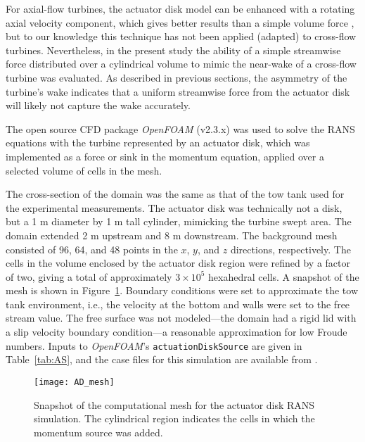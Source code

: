 For axial-flow turbines, the actuator disk model can be enhanced with a rotating
axial velocity component, which gives better results than a simple volume force
\cite{Wu2011}, but to our knowledge this technique has not been applied
(adapted) to cross-flow turbines. Nevertheless, in the present study the
ability of a simple streamwise force distributed over a cylindrical volume to
mimic the near-wake of a cross-flow turbine was evaluated. As described in
previous sections, the asymmetry of the turbine's wake indicates that a uniform
streamwise force from the actuator disk will likely not capture the wake
accurately.

The open source CFD package \textit{OpenFOAM} (v2.3.x) was used to solve the
RANS equations with the turbine represented by an actuator disk, which was
implemented as a force or sink in the momentum equation, applied over a selected
volume of cells in the mesh.

The cross-section of the domain was the same as that of the tow tank used for
the experimental measurements. The actuator disk was technically not a disk, but
a 1 m diameter by 1 m tall cylinder, mimicking the turbine swept area. The
domain extended 2 m upstream and 8 m downstream.  The background mesh consisted
of 96, 64, and 48 points in the $x$, $y$, and $z$ directions, respectively. The
cells in the volume enclosed by the actuator disk region were refined by a
factor of two, giving a total of  approximately $3 \times 10^5$ hexahedral
cells. A snapshot of the mesh is shown in Figure~\ref{fig:AD-mesh}. Boundary
conditions were set to approximate the tow tank environment, i.e., the velocity
at the bottom and walls were set to the free stream value. The free surface was
not modeled---the domain had a rigid lid with a slip velocity boundary
condition---a reasonable approximation for low Froude numbers. Inputs to
\textit{OpenFOAM}'s \texttt{actuationDiskSource} are given in
Table~\ref{tab:AS}, and the case files for this simulation are available from
\cite{Bachant2014-OF-AS-case-files}.

\begin{figure}
    \centering

    \texttt{[image: AD\_mesh]}

    \caption{Snapshot of the computational mesh for the actuator disk RANS
        simulation. The cylindrical region indicates the cells in which the momentum
        source was added.}
    
    \label{fig:AD-mesh}
\end{figure}

